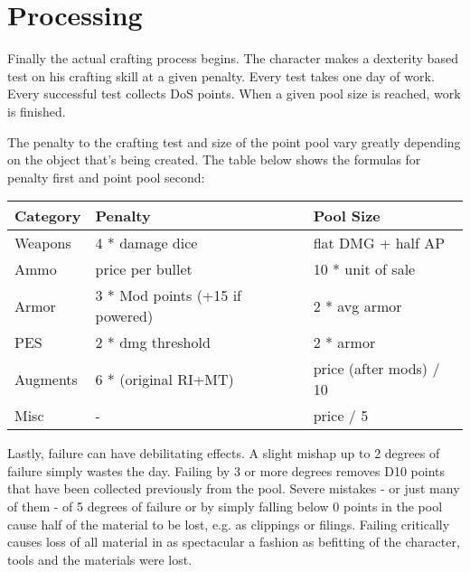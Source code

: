 \documentclass[12pt,a4paper,openany]{book}
\begin{document}
	\chapter{Processing}
	Finally the actual crafting process begins. The character makes a dexterity based test on his crafting skill at a given penalty. Every test takes one day of work. Every successful test collects DoS points. When a given pool size is reached, work is finished.\par
	The penalty to the crafting test and size of the point pool vary greatly depending on the object that’s being created. The table below shows the formulas for penalty first and point pool second:
	\par
	\begin{tabularx}{\columnwidth}{X|ll}
		Category & Penalty & Pool Size \\ \hline
		Weapons & 4 * damage dice & flat DMG + half AP \\
		Ammo & price per bullet & 10 * unit of sale \\
		Armor & 3 * Mod points (+15 if powered) & 2 * avg armor \\
		PES & 2 * dmg threshold & 2 * armor \\
		Augments & 6 * (original RI+MT) & price (after mods) / 10 \\
		Misc & - & price / 5
	\end{tabularx}\par
	Lastly, failure can have debilitating effects.
	A slight mishap up to 2 degrees of failure simply wastes the day.
	Failing by 3 or more degrees removes D10 points that have been collected previously from the pool.
	Severe mistakes - or just many of them - of 5 degrees of failure or by simply falling below 0 points in the pool cause half of the material to be lost, e.g. as clippings or filings.
	Failing critically causes loss of all material in as spectacular a fashion as befitting of the character, tools and the materials were lost.
\end{document}
